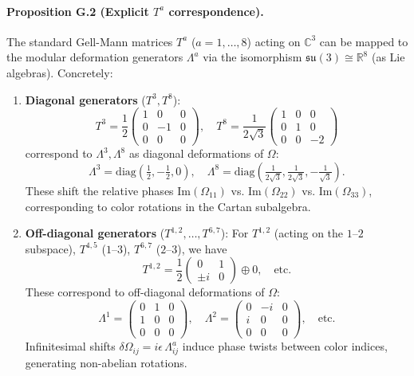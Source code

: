 \paragraph{Proposition G.2 (Explicit $T^a$ correspondence).}
The standard Gell-Mann matrices $T^a$ ($a=1,\ldots,8$) acting on $\mathbb{C}^3$ can be mapped to the modular deformation generators $\Lambda^a$ via the isomorphism $\mathfrak{su}(3) \cong \mathbb{R}^8$ (as Lie algebras). Concretely:
\begin{enumerate}
\item \textbf{Diagonal generators} ($T^3,T^8$):
\begin{equation}
T^3 = \frac{1}{2}\begin{pmatrix}1&0&0\\0&-1&0\\0&0&0\end{pmatrix}, 
\quad 
T^8 = \frac{1}{2\sqrt{3}}\begin{pmatrix}1&0&0\\0&1&0\\0&0&-2\end{pmatrix}
\end{equation}
correspond to $\Lambda^3,\Lambda^8$ as diagonal deformations of $\Omega$:
\begin{equation}
\Lambda^3 = \mathrm{diag}(\tfrac{1}{2},-\tfrac{1}{2},0), 
\quad 
\Lambda^8 = \mathrm{diag}(\tfrac{1}{2\sqrt{3}},\tfrac{1}{2\sqrt{3}},-\tfrac{1}{\sqrt{3}}).
\end{equation}
These shift the relative phases $\mathrm{Im}(\Omega_{11})$ vs. $\mathrm{Im}(\Omega_{22})$ vs. $\mathrm{Im}(\Omega_{33})$, corresponding to color rotations in the Cartan subalgebra.

\item \textbf{Off-diagonal generators} ($T^{1,2},\ldots,T^{6,7}$):
For $T^{1,2}$ (acting on the $1$–$2$ subspace), $T^{4,5}$ ($1$–$3$), $T^{6,7}$ ($2$–$3$), we have
\begin{equation}
T^{1,2} = \frac{1}{2}\begin{pmatrix}0&1\\\pm i&0\end{pmatrix} \oplus 0, 
\quad \text{etc.}
\end{equation}
These correspond to off-diagonal deformations of $\Omega$:
\begin{equation}
\Lambda^{1} = \begin{pmatrix}0&1&0\\1&0&0\\0&0&0\end{pmatrix}, 
\quad 
\Lambda^{2} = \begin{pmatrix}0&-i&0\\i&0&0\\0&0&0\end{pmatrix}, 
\quad \text{etc.}
\end{equation}
Infinitesimal shifts $\delta\Omega_{ij} = i\epsilon\,\Lambda^a_{ij}$ induce phase twists between color indices, generating non-abelian rotations.
\end{enumerate}

